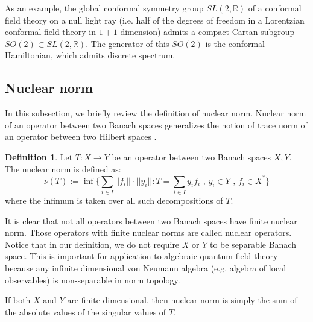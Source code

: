 \documentclass[a4paper,11pt]{article}
\theoremstyle{definition}
\newtheorem{definition}{Definition}[section]
\begin{document}
As an example, the global conformal symmetry group $SL(2,\mathbb{R})$ of a conformal field theory on a null light ray (i.e. half of the degrees of freedom in a Lorentzian conformal field theory in $1+1$-dimension) admits a compact Cartan subgroup $SO(2)\subset SL(2, \mathbb{R})$. The generator of this $SO(2)$ is the conformal Hamiltonian, which admits discrete spectrum.

\subsection{Nuclear norm}\label{subsection:defnuclear}
In this subsection, we briefly review the definition of nuclear norm. Nuclear norm of an operator between two Banach spaces generalizes the notion of trace norm of an operator between two Hilbert spaces \cite{nuclearandsumming}. 
\begin{definition}
    Let $T:X\rightarrow Y$ be an operator between two Banach spaces $X,Y$. The nuclear norm is defined as:
    \begin{equation}
        \nu(T) := \inf\{\sum_{i\in I}||f_i||\cdot||y_i||: T = \sum_{i\in I}y_if_i\text{ , }y_i\in Y\text{ , }f_i\in X^*\}
    \end{equation}
    where the infimum is taken over all such decompositions of $T$. 
\end{definition}
It is clear that not all operators between two Banach spaces have finite nuclear norm. Those operators with finite nuclear norms are called nuclear operators. Notice that in our definition, we do not require $X$ or $Y$ to be separable Banach space. This is important for application to algebraic quantum field theory because any infinite dimensional von Neumann algebra (e.g. algebra of local observables) is non-separable in norm topology. 

If both $X$ and $Y$ are finite dimensional, then nuclear norm is simply the sum of the absolute values of the singular values of $T$.




\end{document}
